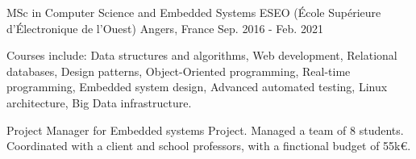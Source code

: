 

\begin{cventries}

  \cventry
    {MSc in Computer Science and Embedded Systems} %
    {ESEO (École Supérieure d'Électronique de l'Ouest)} %
    {Angers, France} %
    {Sep. 2016 - Feb. 2021} %
    {
      \begin{cvitems} %
        \item {Courses include: Data structures and algorithms, Web development, Relational databases, Design patterns, Object-Oriented programming, Real-time programming, Embedded system design, Advanced automated testing, Linux architecture, Big Data infrastructure.}
        \item {Project Manager for Embedded systems Project. Managed a team of 8 students. Coordinated with a client and school professors, with a finctional budget of 55k€.}
      \end{cvitems}
    }

\end{cventries}
